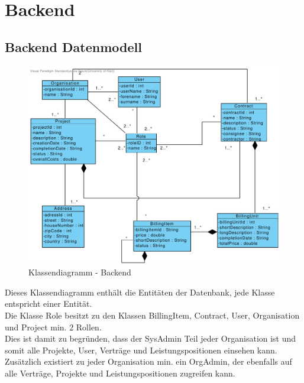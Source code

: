 
\section{Backend}

\subsection{Backend Datenmodell}

\begin{figure}[H]
	\centering
	\includegraphics[width=\linewidth]{img/diagrams/class-diagram-backend.pdf}
	\caption{Klassendiagramm - Backend}
	\label{fig:klassendiagramm-backend}
\end{figure}

\clearpage

\noindent
Dieses Klassendiagramm enthält die Entitäten der Datenbank, jede Klasse entspricht einer Entität. \\
Die Klasse Role besitzt zu den Klassen BillingItem, Contract, User, Organisation und Project min. 2 Rollen. \\
Dies ist damit zu begründen, dass der SysAdmin Teil jeder Organisation ist und somit alle Projekte, User, Verträge und Leistungspositionen einsehen kann.
Zusätzlich existiert zu jeder Organisation min. ein OrgAdmin, der ebenfalls auf alle Verträge, Projekte und Leistungspositionen zugreifen kann.
 
